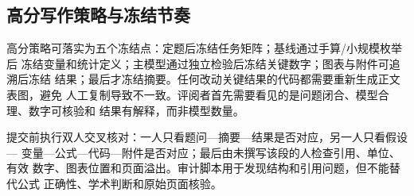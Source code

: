 \subsection{高分写作策略与冻结节奏}

高分策略可落实为五个冻结点：定题后冻结任务矩阵；基线通过手算/小规模枚举后
冻结变量和统计定义；主模型通过独立检验后冻结关键数字；图表与附件可追溯后冻结
结果；最后才冻结摘要。任何改动关键结果的代码都需要重新生成正文表图，避免
人工复制导致不一致。评阅者首先需要看见的是问题闭合、模型合理、数字可核验和
结果有解释，而非模型数量。

提交前执行双人交叉核对：一人只看题问—摘要—结果是否对应，另一人只看假设—
变量—公式—代码—附件是否对应；最后由未撰写该段的人检查引用、单位、有效
数字、图表位置和页面溢出。审计脚本用于发现结构和引用问题，但不能替代公式
正确性、学术判断和原始页面核验。

